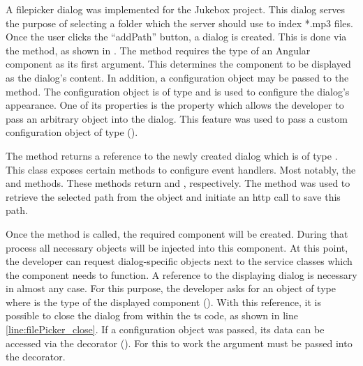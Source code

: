A filepicker dialog was implemented for the Jukebox project. This dialog serves the purpose of selecting a folder which the server should use to index *.mp3 files. Once the user clicks the \enquote{addPath} button, a dialog is created. This is done via the  method, as shown in . The  method requires the type of an Angular component as its first argument. This determines the component to be displayed as the dialog's content. In addition, a configuration object may be passed to the method. The configuration object is of type  and is used to configure the dialog's appearance. One of its properties is the  property which allows the developer to pass an arbitrary object into the dialog. This feature was used to pass a custom configuration object of type  ().

The  method returns a reference to the newly created dialog which is of type . This class exposes certain methods to configure event handlers. Most notably, the  and  methods. These methods return  and , respectively. The  method was used to retrieve the selected path from the  object and initiate an \gls{http} call to save this path.


Once the  method is called, the required component will be created. During that process all necessary objects will be injected into this component. At this point, the developer can request dialog-specific objects next to the service classes which the component needs to function. A reference to the displaying dialog is necessary in almost any case. For this purpose, the developer asks for an object of type  where  is the type of the displayed component (). With this reference, it is possible to close the dialog from within the \gls{ts} code, as shown in line \ref{line:filePicker_close}. If a configuration object was passed, its data can be accessed via the  decorator (). For this to work the  argument must be passed into the decorator. \cite{matDialog}


